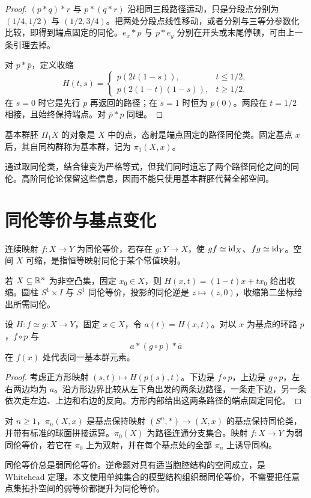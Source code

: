 \begin{proof}
$(p*q)*r$ 与 $p*(q*r)$ 沿相同三段路径运动，只是分段点分别为 $(1/4,1/2)$ 与 $(1/2,3/4)$。把两处分段点线性移动，或者分别与三等分参数化比较，即得到端点固定的同伦。$e_x*p$ 与 $p*e_y$ 分别在开头或末尾停顿，可由上一条引理去掉。

对 $p*\overline p$，定义收缩
\[
H(t,s)=
\begin{cases}
p(2t(1-s)),&t\le1/2,\\
p(2(1-t)(1-s)),&t\ge1/2.
\end{cases}
\]
在 $s=0$ 时它是先行 $p$ 再返回的路径；在 $s=1$ 时恒为 $p(0)$。两段在 $t=1/2$ 相接，且始终保持端点。对 $\overline p*p$ 同理。
\end{proof}
\begin{definition}[基本群胚与基本群]
基本群胚 $\Pi_1X$ 的对象是 $X$ 中的点，态射是端点固定的路径同伦类。固定基点 $x$ 后，其自同构群称为基本群，记为 $\pi_1(X,x)$。
\end{definition}
\begin{remark}
通过取同伦类，结合律变为严格等式，但我们同时遗忘了两个路径同伦之间的同伦。高阶同伦论保留这些信息，因而不能只使用基本群胚代替全部空间。
\end{remark}

\section{同伦等价与基点变化}
\begin{definition}[同伦等价]
连续映射 $f:X\to Y$ 为同伦等价，若存在 $g:Y\to X$，使 $gf\simeq\operatorname{id}_X$、$fg\simeq\operatorname{id}_Y$。空间 $X$ 可缩，是指恒等映射同伦于某个常值映射。
\end{definition}
\begin{example}
若 $X\subseteq\mathbb R^n$ 为非空凸集，固定 $x_0\in X$，则 $H(x,t)=(1-t)x+tx_0$ 给出收缩。圆柱 $S^1\times I$ 与 $S^1$ 同伦等价，投影的同伦逆是 $z\mapsto(z,0)$，收缩第二坐标给出所需同伦。
\end{example}
\begin{proposition}[同伦引起的基点共轭]
设 $H:f\simeq g:X\to Y$，固定 $x\in X$，令 $a(t)=H(x,t)$。对以 $x$ 为基点的环路 $p$，$f\circ p$ 与
\[
a*(g\circ p)*\overline a
\]
在 $f(x)$ 处代表同一基本群元素。
\end{proposition}
\begin{proof}
考虑正方形映射 $(s,t)\mapsto H(p(s),t)$。下边是 $f\circ p$，上边是 $g\circ p$，左右两边均为 $a$。沿方形边界比较从左下角出发的两条边路径，一条走下边，另一条依次走左边、上边和右边的反向。方形内部给出这两条路径的端点固定同伦。
\end{proof}
\begin{definition}[高阶同伦群与弱同伦等价]
对 $n\ge1$，$\pi_n(X,x)$ 是基点保持映射 $(S^n,*)\to(X,x)$ 的基点保持同伦类，并带有标准的球面拼接运算。$\pi_0(X)$ 为路径连通分支集合。映射 $f:X\to Y$ 为弱同伦等价，若它在 $\pi_0$ 上为双射，并在每个基点处的全部 $\pi_n$ 上诱导同构。
\end{definition}
\begin{remark}
同伦等价总是弱同伦等价。逆命题对具有适当胞腔结构的空间成立，是 Whitehead 定理。本文使用单纯集合的模型结构组织弱同伦等价，不需要把任意点集拓扑空间的弱等价都提升为同伦等价。
\end{remark}

